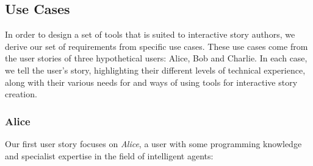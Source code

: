 \documentclass[11pt]{report}
\begin{document}
\subsection{Use Cases}
\label{sec:use-cases}

In order to design a set of tools that is suited to interactive story authors, we derive our set of requirements from specific use
cases. These use cases come from the user stories of three hypothetical users: Alice, Bob and
Charlie. In each case, we tell the user's story, highlighting their different
levels of technical experience, along with
their various needs for and ways of using tools for
interactive story creation.

\subsubsection{Alice}

Our first user story focuses on \emph{Alice}, a user with some programming knowledge and
specialist expertise in the field of intelligent agents:
\end{document}
